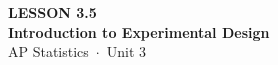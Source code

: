 \documentclass[aspectratio=169, 11pt]{beamer}
\begin{document}
{
\begin{frame}[plain]
  \vspace{2.8cm}\hspace{0.55cm}%
  \begin{minipage}{0.9\textwidth}
    {\color{goldacc}\bfseries\small LESSON 3.5}\\[0.5cm]
    {\color{white}\bfseries\LARGE Introduction to Experimental Design}\\[1.2cm]
    {\color{skymid}\small AP Statistics~$\cdot$~Unit 3}
  \end{minipage}
\end{frame}
}

\begin{frame}[t, plain]
\end{frame}
\end{document}
